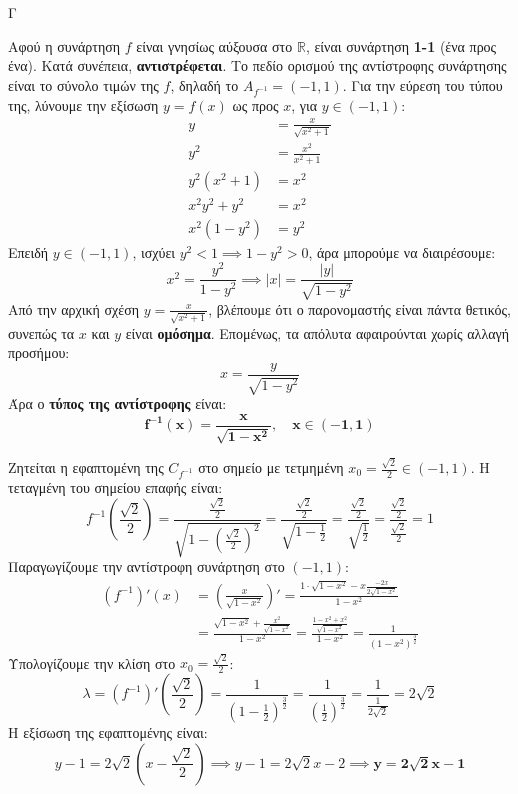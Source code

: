 \begin{thema}{Γ}
\begin{erwthma}
\item Αφού η συνάρτηση $f$ είναι γνησίως αύξουσα στο $\mathbb{R}$, είναι συνάρτηση \textbf{1-1} (ένα προς ένα). 
Κατά συνέπεια, \textbf{αντιστρέφεται}.
Το πεδίο ορισμού της αντίστροφης συνάρτησης είναι το σύνολο τιμών της $f$, δηλαδή το $A_{f^{-1}} = (-1, 1)$.
Για την εύρεση του τύπου της, λύνουμε την εξίσωση $y = f(x)$ ως προς $x$, για $y \in (-1, 1)$:
\begin{align*}
y &= \frac{x}{\sqrt{x^2+1}} \\
y^2 &= \frac{x^2}{x^2+1} \\
y^2(x^2+1) &= x^2 \\
x^2y^2 + y^2 &= x^2 \\
x^2(1 - y^2) &= y^2
\end{align*}
Επειδή $y \in (-1, 1)$, ισχύει $y^2 < 1 \implies 1-y^2 > 0$, άρα μπορούμε να διαιρέσουμε:
\[ x^2 = \frac{y^2}{1-y^2} \implies |x| = \frac{|y|}{\sqrt{1-y^2}} \]
Από την αρχική σχέση $y = \frac{x}{\sqrt{x^2+1}}$, βλέπουμε ότι ο παρονομαστής είναι πάντα θετικός, συνεπώς τα $x$ και $y$ είναι \textbf{ομόσημα}. Επομένως, τα απόλυτα αφαιρούνται χωρίς αλλαγή προσήμου:
\[ x = \frac{y}{\sqrt{1-y^2}} \]
Άρα ο \textbf{τύπος της αντίστροφης} είναι:
\[ \boldsymbol{f^{-1}(x) = \frac{x}{\sqrt{1-x^2}}, \quad x \in (-1, 1)} \]

\item Ζητείται η εφαπτομένη της $C_{f^{-1}}$ στο σημείο με τετμημένη $x_0 = \frac{\sqrt{2}}{2} \in (-1, 1)$.
Η τεταγμένη του σημείου επαφής είναι:
\[ f^{-1}\left(\frac{\sqrt{2}}{2}\right) = \frac{\frac{\sqrt{2}}{2}}{\sqrt{1-\left(\frac{\sqrt{2}}{2}\right)^2}} = \frac{\frac{\sqrt{2}}{2}}{\sqrt{1-\frac{1}{2}}} = \frac{\frac{\sqrt{2}}{2}}{\sqrt{\frac{1}{2}}} = \frac{\frac{\sqrt{2}}{2}}{\frac{\sqrt{2}}{2}} = 1 \]
Παραγωγίζουμε την αντίστροφη συνάρτηση στο $(-1, 1)$:
\begin{align*}
(f^{-1})'(x) &= \left( \frac{x}{\sqrt{1-x^2}} \right)' = \frac{1\cdot \sqrt{1-x^2} - x\frac{-2x}{2\sqrt{1-x^2}}}{1-x^2} \\
&= \frac{\sqrt{1-x^2} + \frac{x^2}{\sqrt{1-x^2}}}{1-x^2} = \frac{\frac{1-x^2+x^2}{\sqrt{1-x^2}}}{1-x^2} = \frac{1}{(1-x^2)^{\frac{3}{2}}}
\end{align*}
Υπολογίζουμε την κλίση στο $x_0 = \frac{\sqrt{2}}{2}$:
\[ \lambda = (f^{-1})'\left(\frac{\sqrt{2}}{2}\right) = \frac{1}{\left(1-\frac{1}{2}\right)^{\frac{3}{2}}} = \frac{1}{\left(\frac{1}{2}\right)^{\frac{3}{2}}} = \frac{1}{\frac{1}{2\sqrt{2}}} = 2\sqrt{2} \]
Η εξίσωση της εφαπτομένης είναι:
\[ y - 1 = 2\sqrt{2}\left(x - \frac{\sqrt{2}}{2}\right) \implies y - 1 = 2\sqrt{2}x - 2 \implies \boldsymbol{y = 2\sqrt{2}x - 1} \]


\end{erwthma}
\end{thema}
